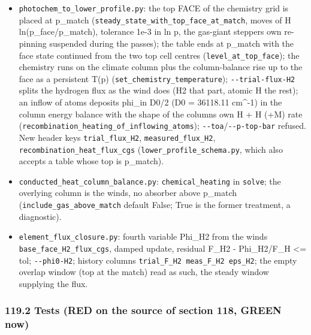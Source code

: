 \documentclass[english,a4paper]{my_memo}
\providecommand{\tightlist}{\setlength{\itemsep}{0pt}\setlength{\parskip}{0pt}}
\begin{document}
\begin{itemize}
\tightlist
\item
  \texttt{photochem\_to\_lower\_profile.py}: the top FACE of the chemistry grid is
  placed at p\_match (\texttt{steady\_state\_with\_top\_face\_at\_match}, moves of
  H ln(p\_face/p\_match), tolerance 1e-3 in ln p, the gas-giant stepper\textquotesingle s own
  re-pinning suspended during the passes); the table ends at p\_match with the
  face state continued from the two top cell centres (\texttt{level\_at\_top\_face});
  the chemistry runs on the climate column plus the column-balance rise up to
  the face as a persistent T(p) (\texttt{set\_chemistry\_temperature});
  \texttt{-\/-trial-flux-H2} splits the hydrogen flux as the wind does (H2 that part,
  atomic H the rest); an inflow of atoms deposits phi\_in D0/2
  (D0 = 36118.11 cm\^{}-1) in the column energy balance with the shape of the
  column\textquotesingle s own H + H (+M) rate (\texttt{recombination\_heating\_of\_inflowing\_atoms});
  \texttt{-\/-toa}/\texttt{-\/-p-top-bar} refused. New header keys \texttt{trial\_flux\_H2},
  \texttt{measured\_flux\_H2}, \texttt{recombination\_heat\_flux\_cgs} (\texttt{lower\_profile\_schema.py},
  which also accepts a table whose top is p\_match).
\item
  \texttt{conducted\_heat\_column\_balance.py}: \texttt{chemical\_heating} in \texttt{solve}; the
  overlying column is the wind\textquotesingle s, no absorber above p\_match
  (\texttt{include\_gas\_above\_match} default False; True is the former treatment, a
  diagnostic).
\item
  \texttt{element\_flux\_closure.py}: fourth variable Phi\_H2 from the wind\textquotesingle s
  \texttt{base\_face\_H2\_flux\_cgs}, damped update, residual
  \textbar F\_H2 - Phi\_H2\textbar/\textbar F\_H\textbar{} \textless= tol; \texttt{-\/-phi0-H2}; history columns
  \texttt{trial\_F\_H2\ meas\_F\_H2\ eps\_H2}; the empty overlap window (top at the match)
  read as such, the steady window supplying the flux.
\end{itemize}

\subsubsection{119.2 Tests (RED on the source of section 118, GREEN now)}\label{1192-tests-red-on-the-source-of-section-118-green-now}
\end{document}
